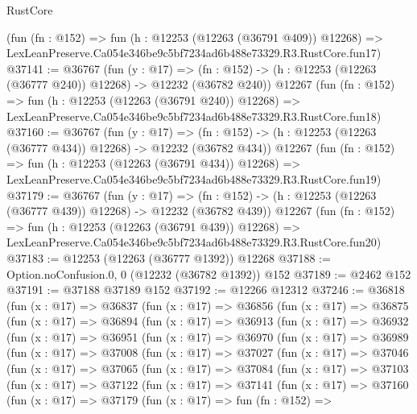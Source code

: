 \begin{lexlean}{RustCore}
\begin{coremodule}
    (fun (fn : @152) =>
    fun (h : @12253 (@12263 (@36791 @409)) @12268) =>
    LexLeanPreserve.Ca054e346be9c5bf7234ad6b488e73329.R3.RustCore.fun17)
@37141 := @36767
    (fun (y : @17) =>
    (fn : @152) -> (h : @12253 (@12263 (@36777 @240)) @12268) -> @12232 (@36782 @240))
    @12267
    (fun (fn : @152) =>
    fun (h : @12253 (@12263 (@36791 @240)) @12268) =>
    LexLeanPreserve.Ca054e346be9c5bf7234ad6b488e73329.R3.RustCore.fun18)
@37160 := @36767
    (fun (y : @17) =>
    (fn : @152) -> (h : @12253 (@12263 (@36777 @434)) @12268) -> @12232 (@36782 @434))
    @12267
    (fun (fn : @152) =>
    fun (h : @12253 (@12263 (@36791 @434)) @12268) =>
    LexLeanPreserve.Ca054e346be9c5bf7234ad6b488e73329.R3.RustCore.fun19)
@37179 := @36767
    (fun (y : @17) =>
    (fn : @152) -> (h : @12253 (@12263 (@36777 @439)) @12268) -> @12232 (@36782 @439))
    @12267
    (fun (fn : @152) =>
    fun (h : @12253 (@12263 (@36791 @439)) @12268) =>
    LexLeanPreserve.Ca054e346be9c5bf7234ad6b488e73329.R3.RustCore.fun20)
@37183 := @12253 (@12263 (@36777 @1392)) @12268
@37188 := Option.noConfusion.{0, 0} (@12232 (@36782 @1392)) @152
@37189 := @2462 @152
@37191 := @37188 @37189 @152
@37192 := @12266 @12312
@37246 := @36818
    (fun (x : @17) =>
    @36837
      (fun (x : @17) =>
      @36856
        (fun (x : @17) =>
        @36875
          (fun (x : @17) =>
          @36894
            (fun (x : @17) =>
            @36913
              (fun (x : @17) =>
              @36932
                (fun (x : @17) =>
                @36951
                  (fun (x : @17) =>
                  @36970
                    (fun (x : @17) =>
                    @36989
                      (fun (x : @17) =>
                      @37008
                        (fun (x : @17) =>
                        @37027
                          (fun (x : @17) =>
                          @37046
                            (fun (x : @17) =>
                            @37065
                              (fun (x : @17) =>
                              @37084
                                (fun (x : @17) =>
                                @37103
                                  (fun (x : @17) =>
                                  @37122
                                    (fun (x : @17) =>
                                    @37141
                                      (fun (x : @17) =>
                                      @37160
                                        (fun (x : @17) =>
                                        @37179
                                          (fun (x : @17) =>
                                          fun (fn : @152) =>

\end{coremodule}
\end{lexlean}
